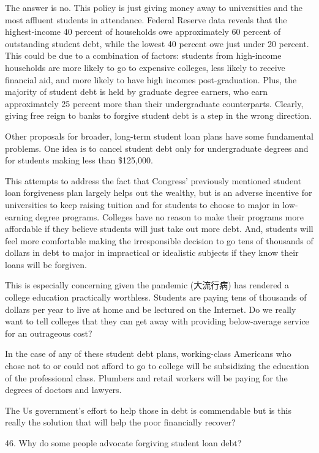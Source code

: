 \documentclass[UTF8,11pt]{ctexart}
\begin{document}
The answer is no. This policy is just giving money away to universities and the most affluent students in attendance. Federal Reserve data reveals that the highest-income 40 percent of households owe approximately 60 percent of outstanding student debt, while the lowest 40 percent owe just under 20 percent. This could be due to a combination of factors: students from high-income households are more likely to go to expensive colleges, less likely to receive financial aid, and more likely to have high incomes post-graduation. Plus, the majority of student debt is held by graduate degree earners, who earn approximately 25 percent more than their undergraduate counterparts. Clearly, giving free reign to banks to forgive student debt is a step in the wrong direction.


Other proposals for broader, long-term student loan plans have some fundamental problems. One idea is to cancel student debt only for undergraduate degrees and for students making less than \$125,000.


This attempts to address the fact that Congress’ previously mentioned student loan forgiveness plan largely helps out the wealthy, but is an adverse incentive for universities to keep raising tuition and for students to choose to major in low-earning degree programs. Colleges have no reason to make their programs more affordable if they believe students will just take out more debt. And, students will feel more comfortable making the irresponsible decision to go tens of thousands of dollars in debt to major in impractical or idealistic subjects if they know their loans will be forgiven.


This is especially concerning given the pandemic (大流行病) has rendered a college education practically worthless. Students are paying tens of thousands of dollars per year to live at home and be lectured on the Internet. Do we really want to tell colleges that they can get away with providing below-average service for an outrageous cost?


In the case of any of these student debt plans, working-class Americans who chose not to or could not afford to go to college will be subsidizing the education of the professional class. Plumbers and retail workers will be paying for the degrees of doctors and lawyers.


The Us government’s effort to help those in debt is commendable but is this really the solution that will help the poor financially recover?


46. Why do some people advocate forgiving student loan debt?
\end{document}
